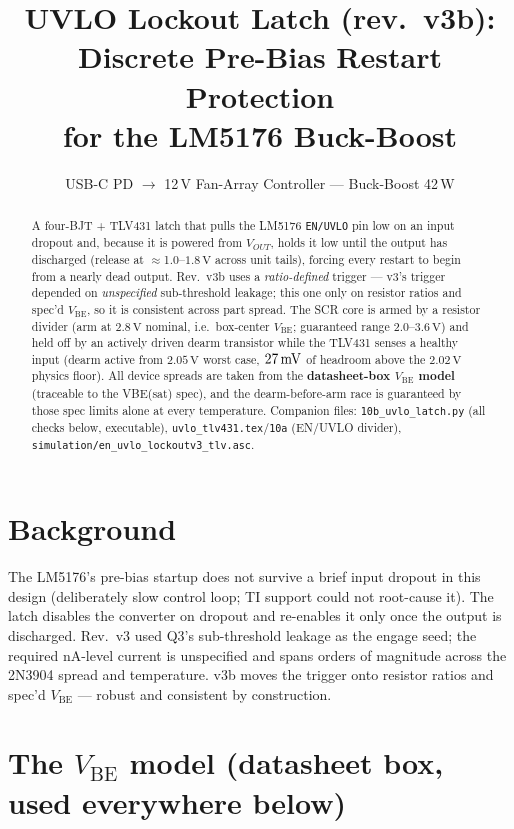 \documentclass[11pt]{article}
\title{UVLO Lockout Latch (rev.\ v3b): Discrete Pre-Bias Restart Protection\\
for the LM5176 Buck-Boost}
\author{USB-C PD $\to$ 12\,V Fan-Array Controller --- Buck-Boost 42\,W}
\date{}
\newcommand{\volt}{\mathrm{V}}\newcommand{\ampere}{\mathrm{A}}
\newcommand{\SI}[2]{\ensuremath{#1\,#2}}
\newcommand{\Vbe}{V_{\mathrm{BE}}}
\newcommand{\Vout}{V_{OUT}}
\begin{document}
\maketitle

\begin{abstract}
\noindent
A four-BJT + TLV431 latch that pulls the LM5176 \texttt{EN/UVLO} pin low on an
input dropout and, because it is powered from $\Vout$, holds it low until the
output has discharged (release at $\approx$1.0--\SI{1.8}{\volt} across unit
tails), forcing every restart to begin from a nearly dead output. Rev.\ v3b uses a
\emph{ratio-defined} trigger --- v3's trigger depended on \emph{unspecified}
sub-threshold leakage; this one only on resistor ratios and spec'd $\Vbe$, so
it is consistent across part spread. The SCR core is armed by a resistor
divider (arm at \SI{2.8}{\volt} nominal, i.e.\ box-center $\Vbe$; guaranteed
range 2.0--\SI{3.6}{\volt}) and held off by an actively driven dearm
transistor while the TLV431 senses a healthy input (dearm active from
\SI{2.05}{\volt} worst case, \SI{27}{\milli\volt} of headroom above the
\SI{2.02}{\volt} physics floor). All device spreads are taken from the
\textbf{datasheet-box $\Vbe$ model} (traceable to the VBE(sat) spec), and the
dearm-before-arm race is guaranteed by those spec limits alone at every
temperature. Companion files: \texttt{10b\_uvlo\_latch.py} (all checks below,
executable), \texttt{uvlo\_tlv431.tex}/\texttt{10a} (EN/UVLO divider),
\texttt{simulation/en\_uvlo\_lockoutv3\_tlv.asc}.
\end{abstract}

\section{Background}

The LM5176's pre-bias startup does not survive a brief input dropout in this
design (deliberately slow control loop; TI support could not root-cause it).
The latch disables the converter on dropout and re-enables it only once the
output is discharged. Rev.\ v3 used Q3's sub-threshold leakage as the engage
seed; the required nA-level current is unspecified and spans orders of
magnitude across the 2N3904 spread and temperature. v3b moves the trigger onto
resistor ratios and spec'd $\Vbe$ --- robust and consistent by construction.

\section{The $\Vbe$ model (datasheet box, used everywhere below)}
\end{document}
